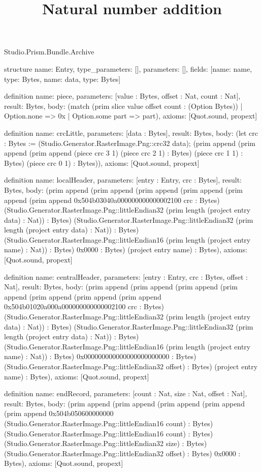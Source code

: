 \begin{lexlean}{Studio.Prism.Bundle.Archive}
\title{Natural number addition}
\begin{semanticmodule}
structure{
  name: Entry,
  type_parameters: [],
  parameters: [],
  fields: [{name: name, type: Bytes}, {name: data, type: Bytes}]
}

definition{
  name: piece,
  parameters: [value : Bytes, offset : Nat, count : Nat],
  result: Bytes,
  body: (match (prim slice value offset count : (Option Bytes))
    | Option.none => 0x
    | Option.some part => part),
  axioms: [Quot.sound, propext]
}

definition{
  name: crcLittle,
  parameters: [data : Bytes],
  result: Bytes,
  body: (let crc : Bytes := (Studio.Generator.RasterImage.Png::crc32 data); (prim append (prim append (prim append (piece crc 3 1) (piece crc 2 1) : Bytes) (piece crc 1 1) : Bytes) (piece crc 0 1) : Bytes)),
  axioms: [Quot.sound, propext]
}

definition{
  name: localHeader,
  parameters: [entry : Entry, crc : Bytes],
  result: Bytes,
  body: (prim append (prim append (prim append (prim append (prim append (prim append 0x504b03040a000000000000002100 crc : Bytes) (Studio.Generator.RasterImage.Png::littleEndian32 (prim length (project entry data) : Nat)) : Bytes) (Studio.Generator.RasterImage.Png::littleEndian32 (prim length (project entry data) : Nat)) : Bytes) (Studio.Generator.RasterImage.Png::littleEndian16 (prim length (project entry name) : Nat)) : Bytes) 0x0000 : Bytes) (project entry name) : Bytes),
  axioms: [Quot.sound, propext]
}

definition{
  name: centralHeader,
  parameters: [entry : Entry, crc : Bytes, offset : Nat],
  result: Bytes,
  body: (prim append (prim append (prim append (prim append (prim append (prim append (prim append 0x504b01020a000a000000000000002100 crc : Bytes) (Studio.Generator.RasterImage.Png::littleEndian32 (prim length (project entry data) : Nat)) : Bytes) (Studio.Generator.RasterImage.Png::littleEndian32 (prim length (project entry data) : Nat)) : Bytes) (Studio.Generator.RasterImage.Png::littleEndian16 (prim length (project entry name) : Nat)) : Bytes) 0x000000000000000000000000 : Bytes) (Studio.Generator.RasterImage.Png::littleEndian32 offset) : Bytes) (project entry name) : Bytes),
  axioms: [Quot.sound, propext]
}

definition{
  name: endRecord,
  parameters: [count : Nat, size : Nat, offset : Nat],
  result: Bytes,
  body: (prim append (prim append (prim append (prim append (prim append 0x504b050600000000 (Studio.Generator.RasterImage.Png::littleEndian16 count) : Bytes) (Studio.Generator.RasterImage.Png::littleEndian16 count) : Bytes) (Studio.Generator.RasterImage.Png::littleEndian32 size) : Bytes) (Studio.Generator.RasterImage.Png::littleEndian32 offset) : Bytes) 0x0000 : Bytes),
  axioms: [Quot.sound, propext]
}


\end{semanticmodule}
\end{lexlean}
